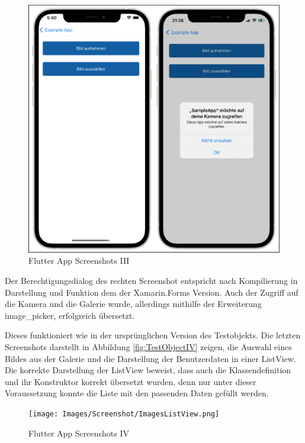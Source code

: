   
\begin{figure}[!ht]
 \includegraphics[width=\textwidth,keepaspectratio]{Images/Screenshot/Permissions.png}
 \caption{Flutter App Screenshots III}
 \label{fig:FlutterAppIII}
\end{figure}
Der Berechtigungsdialog des rechten Screenshot entspricht nach Kompilierung in Darstellung und 
Funktion dem der Xamarin.Forms Version.  Auch der Zugriff auf die Kamera und die Galerie wurde, allerdings mithilfe der Erweiterung image\_picker, erfolgreich übersetzt.

Dieses funktioniert wie in der ursprünglichen Version des Testobjekts.  Die letzten Screenshots darstellt in Abbildung \ref{fig:TestObjectIV} zeigen,  die Auswahl eines Bildes aus der Galerie und die Darstellung der Benutzerdaten in einer ListView.  Die korrekte Darstellung der ListView beweist, dass auch die Klassendefinition und ihr
Konstruktor korrekt übersetzt wurden, denn nur unter dieser Voraussetzung konnte die Liste mit den 
passenden Daten gefüllt werden.

 
  
\begin{figure}[!ht]
 \texttt{[image: Images/Screenshot/ImagesListView.png]}
 \caption{Flutter App Screenshots IV}
 \label{fig:FlutterAppIV}
\end{figure}


